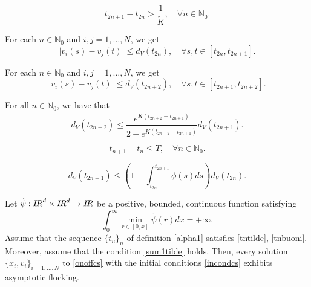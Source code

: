\documentclass[10pt,a4paper]{amsart}
\newcommand{\RR}{{{\rm I} \kern -.15em {\rm R} }}
\begin{document}
\begin{equation}\label{tnbuoni}
	t_{2n+1}-t_{2n}>\frac{1}{\tilde K},\quad \forall n\in \mathbb{N}_0.
\end{equation}

	For each $n\in \mathbb{N}_{0}$ and $i,j=1,\dots,N$, we get \begin{equation}
		\label{distcs}
		\lvert v_{i}(s)-v_{j}(t)\rvert\leq d_{V}(t_{2n}), \quad\forall s,t\in [t_{2n},t_{2n+1}].
	\end{equation} 

	For each $n\in \mathbb{N}_{0}$ and $i,j=1,\dots,N$, we get \begin{equation}
		\label{dist-1cs}
		\lvert v_{i}(s)-v_{j}(t)\rvert\leq d_{V}(t_{2n+2}), \quad\forall s,t\in [t_{2n+1},t_{2n+2}].
	\end{equation} 

\begin{lem}
	For all $n\in \mathbb{N}_{0}$, we have that
	\begin{equation}\label{boundgrowthcs}
		d_{V}(t_{2n+2})\leq \frac{e^{\tilde K(t_{2n+2}-t_{2n+1})}}{2-e^{\tilde K(t_{2n+2}-t_{2n+1})}}d_{V}(t_{2n+1}).
	\end{equation}
\end{lem} 

\begin{equation}\label{boundbc}
	t_{n+1}-t_{n}\leq T,\quad \forall n\in \mathbb{N}_0.
\end{equation} 

	\begin{equation}\label{n-2cs}
		d_{V}(t_{2n+1})\leq \left(1-\int_{t_{2n}}^{t_{2n+1}}\phi(s)ds\right)d_{V}(t_{2n}).
	\end{equation}

\begin{thm}\label{af}
	Let $\tilde\psi:\RR^d\times \RR^d\rightarrow\RR$ be a positive, bounded, continuous function satisfying \begin{equation}\label{infint}
		\int_{0}^{\infty}\min_{r\in [0,x]}\tilde \psi(r)dx=+\infty.
	\end{equation} Assume that the sequence $\{t_{n}\}_{n}$ of definition \eqref{alpha1} satisfies \eqref{tntilde}, \eqref{tnbuoni}. Moreover, assume that the condition \eqref{sum1tilde} holds.
	Then, every solution $\{x_{i},v_{i}\}_{i=1,\dots,N}$ to \eqref{onoffcs} with the initial conditions \eqref{incondcs} exhibits asymptotic flocking.
	\end{thm}
\end{document}
